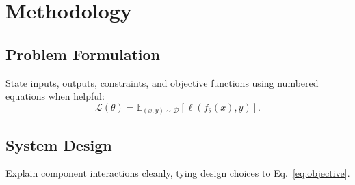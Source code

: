 \section{Methodology}
\label{sec:method}


\subsection{Problem Formulation}
\label{subsec:formulation}

State inputs, outputs, constraints, and objective functions using numbered equations when helpful:
\begin{equation}
  \label{eq:objective}
  \mathcal{L}(\theta) = \mathbb{E}_{(x,y) \sim \mathcal{D}} \left[ \ell(f_{\theta}(x), y) \right].
\end{equation}

\subsection{System Design}
\label{subsec:design}

Explain component interactions cleanly, tying design choices to Eq.~\eqref{eq:objective}.

